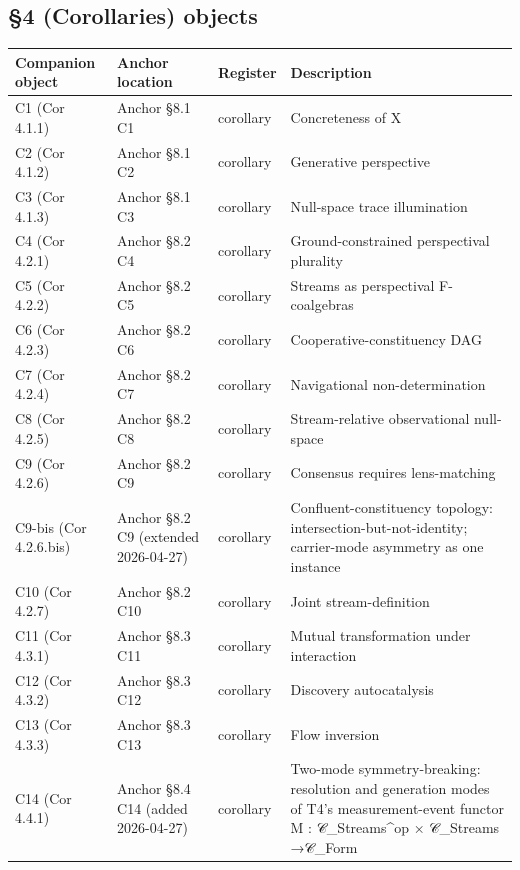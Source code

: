 \documentclass[11pt, openany]{book}
\begin{document}
\subsection{§4 (Corollaries) objects}

\begingroup\setlength{\tabcolsep}{3pt}\renewcommand{\arraystretch}{1.15}\footnotesize
\begin{longtable}{p{0.53in} p{0.61in} p{0.53in} p{2.61in}}
\toprule
Companion object & Anchor location & Register & Description \\
\midrule
\endhead
\bottomrule
\endfoot
C1 (Cor 4.1.1) & Anchor §8.1 C1 & corollary & Concreteness of X \\
\midrule
C2 (Cor 4.1.2) & Anchor §8.1 C2 & corollary & Generative perspective \\
\midrule
C3 (Cor 4.1.3) & Anchor §8.1 C3 & corollary & Null-space trace illumination \\
\midrule
C4 (Cor 4.2.1) & Anchor §8.2 C4 & corollary & Ground-constrained perspectival plurality \\
\midrule
C5 (Cor 4.2.2) & Anchor §8.2 C5 & corollary & Streams as perspectival F-coalgebras \\
\midrule
C6 (Cor 4.2.3) & Anchor §8.2 C6 & corollary & Cooperative-constituency DAG \\
\midrule
C7 (Cor 4.2.4) & Anchor §8.2 C7 & corollary & Navigational non-determination \\
\midrule
C8 (Cor 4.2.5) & Anchor §8.2 C8 & corollary & Stream-relative observational null-space \\
\midrule
C9 (Cor 4.2.6) & Anchor §8.2 C9 & corollary & Consensus requires lens-matching \\
\midrule
C9-bis (Cor 4.2.6.bis) & Anchor §8.2 C9 (extended 2026-04-27) & corollary & Confluent-constituency topology: intersection-but-not-identity; carrier-mode asymmetry as one instance \\
\midrule
C10 (Cor 4.2.7) & Anchor §8.2 C10 & corollary & Joint stream-definition \\
\midrule
C11 (Cor 4.3.1) & Anchor §8.3 C11 & corollary & Mutual transformation under interaction \\
\midrule
C12 (Cor 4.3.2) & Anchor §8.3 C12 & corollary & Discovery autocatalysis \\
\midrule
C13 (Cor 4.3.3) & Anchor §8.3 C13 & corollary & Flow inversion \\
\midrule
C14 (Cor 4.4.1) & Anchor §8.4 C14 (added 2026-04-27) & corollary & Two-mode symmetry-breaking: resolution and generation modes of T4's measurement-event functor M : 𝒞\_\allowbreak{}Streams\textasciicircum{}op × 𝒞\_\allowbreak{}Streams →\allowbreak  𝒞\_\allowbreak{}Form \\

\end{longtable}
\end{document}
